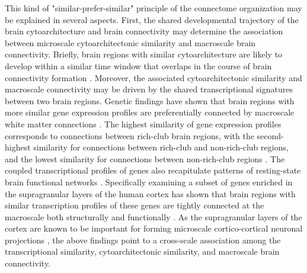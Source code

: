 \begin{refsection}
This kind of "similar-prefer-similar" principle of the connectome organization may be explained in several aspects. First, the shared developmental trajectory of the brain cytoarchitecture and brain connectivity may determine the association between microscale cytoarchitectonic similarity and macroscale brain connectivity. Briefly, brain regions with similar cytoarchitecture are likely to develop within a similar time window that overlaps in the course of brain connectivity formation \citep{barbas2015general,hilgetag2016primate,beul2017predictive}. Moreover, the associated cytoarchitectonic similarity and macroscale connectivity may be driven by the shared transcriptional signatures between two brain regions. Genetic findings have shown that brain regions with more similar gene expression profiles are preferentially connected by macroscale white matter connections \citep{French2011RelationshipsBG}. The highest similarity of gene expression profiles corresponds to connections between rich-club brain regions, with the second-highest similarity for connections between rich-club and non-rich-club regions, and the lowest similarity for connections between non-rich-club regions \citep{Fulcher2016ATS}. The coupled transcriptional profiles of genes also recapitulate patterns of resting-state brain functional networks \citep{richiardi2015correlated}. Specifically examining a subset of genes enriched in the supragranular layers of the human cortex has shown that brain regions with similar transcription profiles of these genes are tightly connected at the macroscale both structurally \citep{RomeroGarcia2018StructuralCN} and functionally \citep{krienen2016transcriptional}. As the supragranular layers of the cortex are known to be important for forming microscale cortico-cortical neuronal projections \citep{Zilles2015CytoarchitectureAM}, the above findings point to a cross-scale association among the transcriptional similarity, cytoarchitectonic similarity, and macroscale brain connectivity.


\end{refsection}
